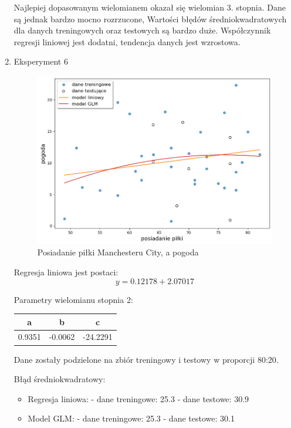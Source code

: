 \documentclass[11pt]{article}
\begin{document}
\begin{enumerate}[label=\alph*)]
    Najlepiej dopasowanym wielomianem okazał się
    wielomian 3. stopnia. Dane są jednak bardzo
    mocno rozrzucone, Wartości błędów średniokwadratowych
    dla danych treningowych oraz testowych są
    bardzo duże. Współczynnik regresji liniowej
    jest dodatni, tendencja danych jest wzrostowa.
    \item Eksperyment 6 \newline
    
    \begin{figure}[hbt]
    \includegraphics[scale=0.30]{weather.png}
    \caption{Posiadanie piłki Manchesteru City, a pogoda}
    \end{figure}

    Regresja liniowa jest postaci:
    \begin{equation}
    y = 0.12178 + 2.07017
    \end{equation}
    
    Parametry wielomianu stopnia 2:
    \begin{center}
    \begin{tabular}{| c | c | c |}
    \hline
    a & b & c \\ \hline
    0.9351 & -0.0062 & -24.2291 \\ \hline
    \end{tabular}
    \end{center}

    Dane zostały podzielone na zbiór treningowy i testowy w proporcji 80:20.
    \newline

    Błąd średniokwadratowy:
    \begin{itemize}
    \item Regresja liniowa: \newline
    - dane treningowe: 25.3 \newline
    - dane testowe: 30.9
    \item Model GLM: \newline
    - dane treningowe: 25.3 \newline
    - dane testowe: 30.1
    \end{itemize}
    

\end{enumerate}
\end{document}
